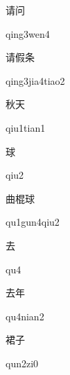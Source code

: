 \begin{multicols*}{2}
\begin{verbete}{请问}
\begin{pronuncia}{qing3wen4}
\end{pronuncia}
\end{verbete}

\begin{verbete}{请假条}
\begin{pronuncia}{qing3jia4tiao2}
\end{pronuncia}
\end{verbete}

\begin{verbete}{秋天}
\begin{pronuncia}{qiu1tian1}
\end{pronuncia}
\end{verbete}

\begin{verbete}[qiu2]{球}
\begin{pronuncia}{qiu2}
\end{pronuncia}
\end{verbete}

\begin{verbete}{曲棍球}
\begin{pronuncia}{qu1gun4qiu2}
\end{pronuncia}
\end{verbete}

\begin{verbete}[qu4]{去}
\begin{pronuncia}{qu4}
\end{pronuncia}
\end{verbete}

\begin{verbete}[qu4nian2]{去年}
\begin{pronuncia}{qu4nian2}
\end{pronuncia}
\end{verbete}

\begin{verbete}[qun2zi0]{裙子}
\begin{pronuncia}{qun2zi0}
\end{pronuncia}
\end{verbete}

\end{multicols*}
